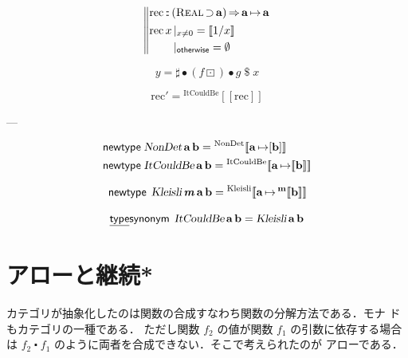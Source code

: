 \documentclass[a5paper,twoside,fleqn,draft]{jsbook}
\def\[{[\![}
\def\]{]\!]}
\newenvironment{leader}{\begingroup\gt}{\endgroup}
\newcommand{\mBrace}{\Vert}
\newcommand{\mKeyword}[1]{\mathsf{#1}}
\newcommand{\mKeywordUnderline}[1]{\text{\underline{\textsf{#1}}}}
\newcommand{\mNewTypeDeclKeyword}{\mKeyword{newtype}}
\newcommand{\mOtherwiseKeyword}{\mKeyword{otherwise}}
\newcommand{\mTypeSynonymDeclKeyword}{\mKeywordUnderline{type}\mKeyword{synonym}}
\DeclareMathOperator{\mNewTypeDecl}{\mNewTypeDeclKeyword}
\DeclareMathOperator{\mOtherwise}{\mOtherwiseKeyword}
\DeclareMathOperator{\mSuperClass}{\Rightarrow}
\DeclareMathOperator{\mSuperSet}{\supset}
\DeclareMathOperator{\mTypeSynonymDecl}{\mTypeSynonymDeclKeyword}
\newcommand{\mNothing}{\emptyset}
\DeclareMathOperator{\mApply}{\$}
\DeclareMathOperator{\mComp}{\bullet}
\DeclareMathOperator{\mCompCat}{\centerdot}
\DeclareMathOperator{\mIn}{{:\!:}}
\DeclareMathOperator{\mMapMaybe}{\boxdot}
\DeclareMathOperator{\mMapsTo}{\mapsto}
\newcommand{\mType}[1]{\mathbf{#1}} %
\newcommand{\mPolymorphicTypeParameter}[1]{\textbf{\textit{#1}}}
\newcommand{\mA}{\mType{a}}
\newcommand{\mB}{\mType{b}}
\newcommand{\mTypeAssemble}[2]{{}^{\mType{#1}}\[\mType{#2}\]}
\newcommand{\mMaybeType}[1]{\[\mType{#1}\]}%
\newcommand{\mTypeConstructor}[1]{\textsl{#1}}
\newcommand{\mValueConstructor}[1]{\mathrm{#1}}
\newcommand{\mValueWith}[2]{{}^\mValueConstructor{#1}\[#2\]}
\newcommand{\mJustWith}[1]{\[#1\]}%
\newcommand{\mTypeClass}[1]{\textsc{#1}} %
\newcommand{\mRealTypeClass}{\mTypeClass{Real}}
\newcommand{\mGuard}[1]{\mathop{\mid_{#1}}}
\begin{document}
\begin{equation}
  \left\mBrace
  \begin{aligned}
    &\mathrm{rec}
    \mIn{}(\mRealTypeClass\mSuperSet\mA)
    \mSuperClass\mA\mMapsTo\mA\\
    &
    \begin{aligned}
      \mathop{\mathrm{rec}}x&\mGuard{x\neq0}
      =\mJustWith{1/x}\\
      &\mGuard{\mOtherwise}
      =\mNothing
    \end{aligned}
  \end{aligned}
  \right.
\end{equation}

\begin{equation}
  y
  =\sharp\mComp(f\mMapMaybe)\mComp g\mApply x
\end{equation}

\begin{equation}
  \mathrm{rec}'
  =\mValueWith{ItCouldBe}{\mathrm{rec}}
\end{equation}

---

\begin{align}
  \mNewTypeDecl\;
  &\mTypeConstructor{NonDet}\,\mA\,\mB
  =\mValueWith{NonDet}{\mA\mMapsTo[\mB]}\\
  \mNewTypeDecl\;
  &\mTypeConstructor{ItCouldBe}\,\mA\,\mB
  =\mValueWith{ItCouldBe}{\mA\mMapsTo\mMaybeType{b}}
\end{align}

\begin{equation}
  \mNewTypeDecl\;
  \mTypeConstructor{Kleisli}\,\mPolymorphicTypeParameter{m}\,\mA\,\mB
  =\mValueWith{Kleisli}{\mA\mMapsTo\mTypeAssemble{m}{\mB}}
\end{equation}

\begin{equation}
  \mTypeSynonymDecl\;
  \mTypeConstructor{ItCouldBe}\,\mA\,\mB
  =\mTypeConstructor{Kleisli}\,\mA\,\mB
\end{equation}

\chapter{アローと継続*}

\begin{leader}
  カテゴリが抽象化したのは関数の合成すなわち関数の分解方法である．モナ
  ドもカテゴリの一種である．%
  ただし関数 $f_2$ の値が関数 $f_1$ の引数に依存する場合は
  $f_2\mCompCat f_1$ のように両者を合成できない．そこで考えられたのが
  アローである．
\end{leader}
\end{document}
